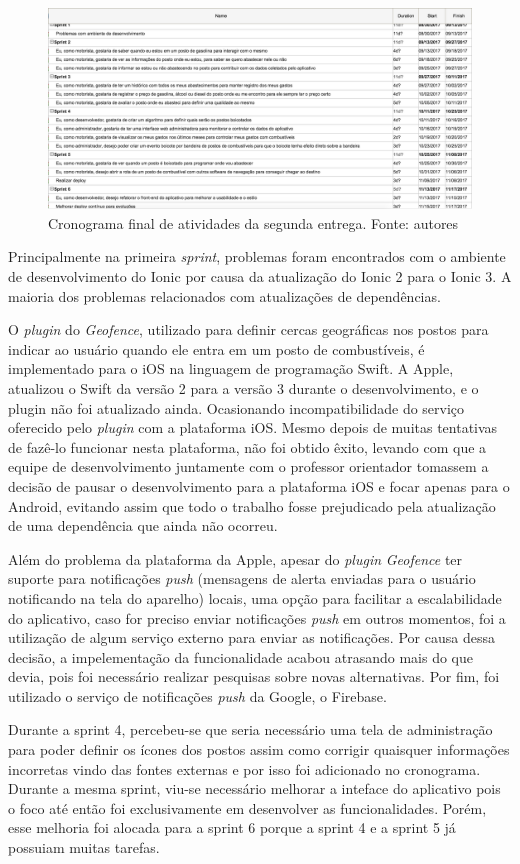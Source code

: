 \begin{figure}[H]
    \centering
    \includegraphics[scale=0.4]{figuras/cronograma_segunda_parte_2.png}
    \caption[Cronograma final de atividades da segunda entrega.]{Cronograma final de atividades da segunda entrega. Fonte: autores}
    \label{img:cronogramafinal}
\end{figure}

Principalmente na primeira \textit{sprint}, problemas foram encontrados com o ambiente de desenvolvimento do Ionic por causa da atualização do Ionic 2 para o Ionic 3. A maioria dos problemas relacionados com atualizações de dependências.

O \textit{plugin} do \textit{Geofence}, utilizado para definir cercas geográficas nos postos para indicar ao usuário quando ele entra em um posto de combustíveis, é implementado para o iOS na linguagem de programação Swift. A Apple, atualizou o Swift da versão 2 para a versão 3 durante o desenvolvimento, e o plugin não foi atualizado ainda. Ocasionando incompatibilidade do serviço oferecido pelo \textit{plugin} com a plataforma iOS. Mesmo depois de muitas tentativas de fazê-lo funcionar nesta plataforma, não foi obtido êxito, levando com que a equipe de desenvolvimento juntamente com o professor orientador tomassem a decisão de pausar o desenvolvimento para a plataforma iOS e focar apenas para o Android, evitando assim que todo o trabalho fosse prejudicado pela atualização de uma dependência que ainda não ocorreu.

Além do problema da plataforma da Apple, apesar do \textit{plugin} \textit{Geofence} ter suporte para notificações \textit{push} (mensagens de alerta enviadas para o usuário notificando na tela do aparelho) locais, uma opção para facilitar a escalabilidade do aplicativo, caso for preciso enviar notificações \textit{push} em outros momentos, foi a utilização de algum serviço externo para enviar as notificações. Por causa dessa decisão, a impelementação da funcionalidade acabou atrasando mais do que devia, pois foi necessário realizar pesquisas sobre novas alternativas. Por fim, foi utilizado o serviço de notificações \textit{push} da Google, o Firebase.

Durante a sprint 4, percebeu-se que seria necessário uma tela de administração para poder definir os ícones dos postos assim como corrigir quaisquer informações incorretas vindo das fontes externas e por isso foi adicionado no cronograma. Durante a mesma sprint, viu-se necessário melhorar a inteface do aplicativo pois o foco até então foi exclusivamente em desenvolver as funcionalidades. Porém, esse melhoria foi alocada para a sprint 6 porque a sprint 4 e a sprint 5 já possuiam muitas tarefas.
